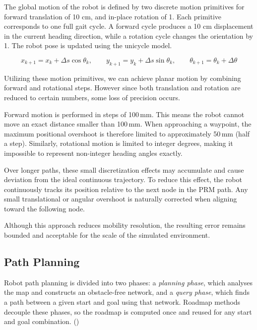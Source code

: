 \documentclass[a4paper,12pt]{article}
\begin{document}
The global motion of the robot is defined by two discrete motion primitives for
forward translation of 10 cm, and in-place rotation of 1\degree. Each primitive
corresponds to one full gait cycle. A forward cycle produces a 10 cm 
displacement in the current heading direction, while a rotation cycle changes
 the orientation by 1\degree. The robot pose is updated using the unicycle model.

\begin{equation}
x_{k+1} = x_k + \Delta s \cos\theta_k,\qquad
y_{k+1} = y_k + \Delta s \sin\theta_k,\qquad
\theta_{k+1} = \theta_k + \Delta\theta
\end{equation}



Utilizing these motion primitives, we can achieve planar motion
by combining forward and rotational steps. However since both
translation and rotation are reduced to certain numbers, some loss of precision occurs.

Forward motion is performed in steps of 100\,mm. This means the robot
cannot move an exact distance smaller than 100\,mm. When approaching a
waypoint, the maximum positional overshoot is therefore limited to
approximately 50\,mm (half a step). Similarly, rotational motion is
limited to integer degrees, making it impossible to represent
non-integer heading angles exactly.

Over longer paths, these small discretization effects may accumulate and
cause deviation from the ideal continuous trajectory. To reduce this
effect, the robot continuously tracks its position relative to the next
node in the PRM path. Any small translational or angular overshoot is
naturally corrected when aligning toward the following node.

Although this approach reduces mobility resolution, the resulting error
remains bounded and acceptable for the scale of the simulated
environment.

\subsection{Path Planning}

Robot path planning is divided into two phases: a \textit{planning phase},
which analyses the map and constructs an obstacle-free network, and a
\textit{query phase}, which finds a path between a given start and goal using
that network. Roadmap methods decouple these phases, so the roadmap is computed
once and reused for any start and goal combination. (\cite{Corke2023})
\end{document}
